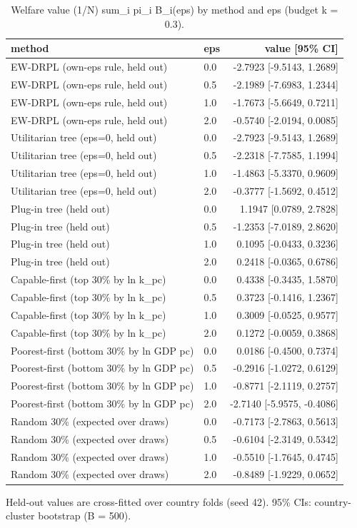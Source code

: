 \begin{table}[htbp]
\centering
\caption{Welfare value (1/N) sum\_i pi\_i B\_i(eps) by method and eps (budget k = 0.3).}
\label{tab:policy_values}
\begin{tabular}{llr}
\toprule
method & eps & value [95\% CI] \\
\midrule
EW-DRPL (own-eps rule, held out) & 0.0 & -2.7923 [-9.5143, 1.2689] \\
EW-DRPL (own-eps rule, held out) & 0.5 & -2.1989 [-7.6983, 1.2344] \\
EW-DRPL (own-eps rule, held out) & 1.0 & -1.7673 [-5.6649, 0.7211] \\
EW-DRPL (own-eps rule, held out) & 2.0 & -0.5740 [-2.0194, 0.0085] \\
Utilitarian tree (eps=0, held out) & 0.0 & -2.7923 [-9.5143, 1.2689] \\
Utilitarian tree (eps=0, held out) & 0.5 & -2.2318 [-7.7585, 1.1994] \\
Utilitarian tree (eps=0, held out) & 1.0 & -1.4863 [-5.3370, 0.9609] \\
Utilitarian tree (eps=0, held out) & 2.0 & -0.3777 [-1.5692, 0.4512] \\
Plug-in tree (held out) & 0.0 & 1.1947 [0.0789, 2.7828] \\
Plug-in tree (held out) & 0.5 & -1.2353 [-7.0189, 2.8620] \\
Plug-in tree (held out) & 1.0 & 0.1095 [-0.0433, 0.3236] \\
Plug-in tree (held out) & 2.0 & 0.2418 [-0.0365, 0.6786] \\
Capable-first (top 30\% by ln k\_pc) & 0.0 & 0.4338 [-0.3435, 1.5870] \\
Capable-first (top 30\% by ln k\_pc) & 0.5 & 0.3723 [-0.1416, 1.2367] \\
Capable-first (top 30\% by ln k\_pc) & 1.0 & 0.3009 [-0.0525, 0.9577] \\
Capable-first (top 30\% by ln k\_pc) & 2.0 & 0.1272 [-0.0059, 0.3868] \\
Poorest-first (bottom 30\% by ln GDP pc) & 0.0 & 0.0186 [-0.4500, 0.7374] \\
Poorest-first (bottom 30\% by ln GDP pc) & 0.5 & -0.2916 [-1.0272, 0.6129] \\
Poorest-first (bottom 30\% by ln GDP pc) & 1.0 & -0.8771 [-2.1119, 0.2757] \\
Poorest-first (bottom 30\% by ln GDP pc) & 2.0 & -2.7140 [-5.9575, -0.4086] \\
Random 30\% (expected over draws) & 0.0 & -0.7173 [-2.7863, 0.5613] \\
Random 30\% (expected over draws) & 0.5 & -0.6104 [-2.3149, 0.5342] \\
Random 30\% (expected over draws) & 1.0 & -0.5510 [-1.7645, 0.4745] \\
Random 30\% (expected over draws) & 2.0 & -0.8489 [-1.9229, 0.0652] \\
\bottomrule
\end{tabular}
\par\smallskip\footnotesize Held-out values are cross-fitted over country folds (seed 42). 95\% CIs: country-cluster bootstrap (B = 500).
\end{table}
